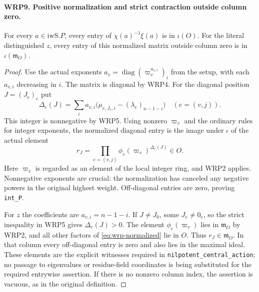 \paragraph{WRP9. Positive normalization and strict contraction outside column zero.}
\label{claim:WRP9}
For every $a\in\mathrm{iwS}.P$, every entry of
$\chi(a)^{-1}\xi(a)$ is in $\iota(O)$.  For the literal
distinguished $z$, every entry of this normalized matrix
outside column zero is in $\iota(\mathfrak m_O)$.
\begin{proof}
Use the actual exponents
$a_v=\operatorname{diag}(\varpi_v^{a_{v,i}})_i$ from
the setup, with each $a_{v,i}$ decreasing in $i$.
The matrix is diagonal by WRP4.  For the diagonal position
$J=(J_e)_e$ put
\[
 \Delta_e(J)=\sum_i a_{v,i}
                \bigl(\mu_{e,J_e,i}-(\lambda_e)_{n-1-i}\bigr)
                \quad(e=(v,j)).
\]
This integer is nonnegative by WRP5.  Using nonzero
$\varpi_v$ and the ordinary rules for integer exponents,
the normalized diagonal entry is the image under $\iota$
of the actual element
\begin{equation}\label{eq:wrp-normalized}
          r_J=\prod_{e=(v,j)}\phi_e(\varpi_v)^{\Delta_e(J)}
                                                        \in O.
\end{equation}
Here $\varpi_v$ is regarded as an element of the local
integer ring, and WRP2 applies.  Nonnegative exponents
are crucial: the normalization has canceled any negative
powers in the original highest weight.  Off-diagonal
entries are zero, proving \texttt{int\_P}.

For $z$ the coefficients are $a_{v,i}=n-1-i$.
If $J\ne J_0$, some $J_e\ne0_e$, so the strict inequality
in WRP5 gives $\Delta_e(J)>0$.  The element
$\phi_e(\varpi_v)$ lies in $\mathfrak m_O$ by WRP2,
and all other factors of \eqref{eq:wrp-normalized} lie
in $O$.  Thus $r_J\in\mathfrak m_O$.  In that column
every off-diagonal entry is zero and also lies in the
maximal ideal.  These elements are the explicit witnesses
required in \texttt{nilpotent\_central\_action}; no
passage to eigenvalues or residue-field coordinates is
being substituted for the required entrywise assertion.
If there is no nonzero column index, the assertion is
vacuous, as in the original definition.
\end{proof}

